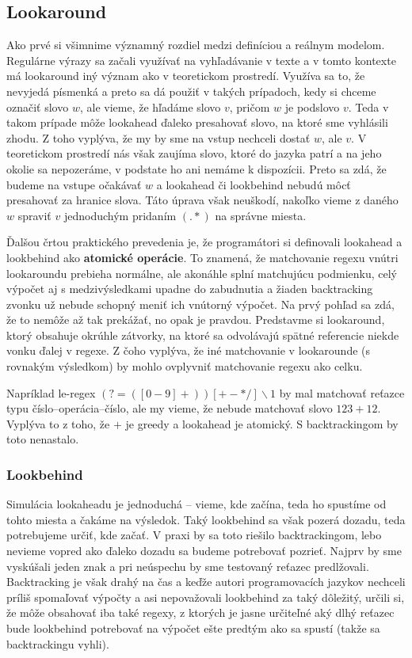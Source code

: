 \subsection*{Lookaround}
\label{praxla}

Ako prvé si všimnime významný rozdiel medzi definíciou a reálnym modelom. Re\-gu\-lár\-ne výrazy sa začali využívať na vyhľadávanie v texte a v tomto kontexte má lookaround iný význam ako v teoretickom prostredí. Využíva sa to, že nevyjedá písmenká a preto sa dá použiť v takých prípadoch, kedy si chceme označiť slovo $w$, ale vieme, že hľadáme slovo $v$, pričom $w$ je podslovo $v$. Teda v takom prípade môže look\-ahead ďaleko presahovať slovo, na ktoré sme vyhlásili zhodu. Z toho vyplýva, že my by sme na vstup nechceli dostať $w$, ale $v$. V teoretickom prostredí nás však zaujíma slovo, ktoré do jazyka patrí a na jeho okolie sa nepozeráme, v podstate ho ani nemáme k dispozícii. Preto sa zdá, že budeme na vstupe očakávať $w$ a lookahead či lookbehind nebudú môcť presahovať za hranice slova. Táto úprava však neuškodí, nakoľko vieme z daného $w$ spraviť $v$ jednoduchým pridaním $(.*)$ na správne miesta.

Ďalšou črtou praktického prevedenia je, že programátori si definovali lookahead a lookbehind ako \textbf{atomické operácie}\cite{LApracticalnote}. To znamená, že matchovanie regexu vnútri lookaroundu prebieha normálne, ale akonáhle splní matchujúcu podmienku, celý výpočet aj s medzivýsledkami upadne do zabudnutia a žiaden back\-tracking zvonku už nebude schopný meniť ich vnútorný výpočet. Na prvý pohľad sa zdá, že to nemôže až tak prekážať, no opak je pravdou. Predstavme si lookaround, ktorý obsahuje okrúhle zátvorky, na ktoré sa odvolávajú spätné referencie niekde vonku ďalej v regexe. Z čoho vyplýva, že iné matchovanie v lookarounde (s rovnakým výsledkom) by mohlo ovplyvniť matchovanie regexu ako celku.

Napríklad le-regex $(?=([0-9]+))[+-*/]\backslash 1$ by mal matchovať reťazce typu číslo--operácia--číslo, ale my vieme, že nebude matchovať slovo $123+12$. Vyplýva to z toho, že $+$ je greedy a lookahead je atomický. S backtrackingom by toto nenastalo.

\subsubsection{Lookbehind}
\label{praxlb}

Simulácia lookaheadu je jednoduchá -- vieme, kde začína, teda ho spustíme od tohto miesta a čakáme na výsledok. Taký lookbehind sa však pozerá dozadu, teda potrebujeme určiť, kde začať. V praxi by sa toto riešilo backtrackingom, lebo nevieme vopred ako ďaleko dozadu sa budeme potrebovať pozrieť. Najprv by sme vyskúšali jeden znak a pri neúspechu by sme testovaný reťazec predlžovali. Backtracking je však drahý na čas a keďže autori programovacích jazykov nechceli príliš spomaľovať výpočty a asi nepovažovali lookbehind za taký dôležitý, určili si, že môže obsahovať iba také regexy, z ktorých je jasne určiteľné aký dlhý reťazec bude lookbehind potrebovať na výpočet ešte predtým ako sa spustí (takže sa backtrackingu vyhli)\cite{LApracticalnote}. 

